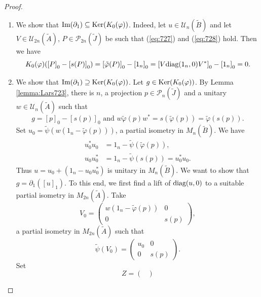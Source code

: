 \documentclass{book}
\def\diag{\textnormal{diag}}
\begin{document}
\begin{proof}
\begin{enumerate}
\[\begin{pmatrix}
      \end{pmatrix}
      +
      \begin{pmatrix}
        0&0\\0&z
      \end{pmatrix}
      \sim_h\begin{pmatrix}
        u&0\\0&1_{n+k}
      \end{pmatrix}.
    \]
    Thus \({[u]}_1={[\tilde{\psi}(V)]}_1=K_1(\psi)({[V]}_1)\).
    \item We show that \(\textnormal{Im}(\partial_1)\subseteq\textnormal{Ker}(K_0(\varphi))\).
    Indeed, let \(u\in\mathcal{U}_n(\tilde{B})\) and let \(V\in\mathcal{U}_{2n}(\tilde{A})\), \(P\in\mathcal{P}_{2n}(\tilde{J})\)
    be such that (\ref{eq:727}) and (\ref{eq:728}) hold. Then we have
    \[
      K_0(\varphi)({[P]}_0-{[s(P)]}_0)={[\tilde{\varphi}(P)]}_0-{[1_n]}_0={[V\diag(1_n,0)V^*]}_0-{[1_n]}_0=0.
    \]
    \item We show that \(\textnormal{Im}(\partial_1)\supseteq\textnormal{Ker}(K_0(\varphi))\). Let \(g\in\textnormal{Ker}(K_0(\varphi))\).
    By Lemma \ref{lemma:Lars723}, there is \(n\), a projection \(p\in\mathcal{P}_n(\tilde{J})\) and a unitary
    \(w\in\mathcal{U}_n(\tilde{A})\) such that
    \[
      g={[p]}_0-{[s(p)]}_0\text{ and }w\tilde{\varphi}(p)w^*=s(\tilde{\varphi}(p))=\tilde{\varphi}(s(p)).
    \]
    Set \(u_0=\tilde{\psi}(w(1_n-\tilde{\varphi}(p)))\), a partial isometry in \(M_n(\tilde{B})\). We have
    \begin{align*}
      u_0^*u_0&=1_n-\tilde{\psi}(\tilde{\varphi}(p)),\\
      u_0u^*_0&=1_n-\tilde{\psi}(s(p))=u_0^*u_0.
    \end{align*}
    Thus \(u=u_0+(1_n-u_0u_0^*)\) is unitary in \(M_n(\tilde{B})\). We want to show that \(g=\partial_1({[u]}_1)\).
    To this end, we first find a lift of \(\diag(u,0)\) to a suitable partial isometry in \(M_{2n}(\tilde{A})\). Take
    \[
      V_0=\begin{pmatrix}
        w(1_n-\tilde{\varphi}(p))&0\\0&s(p)
      \end{pmatrix},
    \]
    a partial isometry in \(M_{2n}(\tilde{A})\) such that
    \[
      \tilde{\psi}(V_0)=\begin{pmatrix}
        u_0&0\\0&s(p)
      \end{pmatrix}.
    \]
    Set 
    \[
      Z=\begin{pmatrix}

\end{pmatrix}\]
\end{enumerate}
\end{proof}
\end{document}
